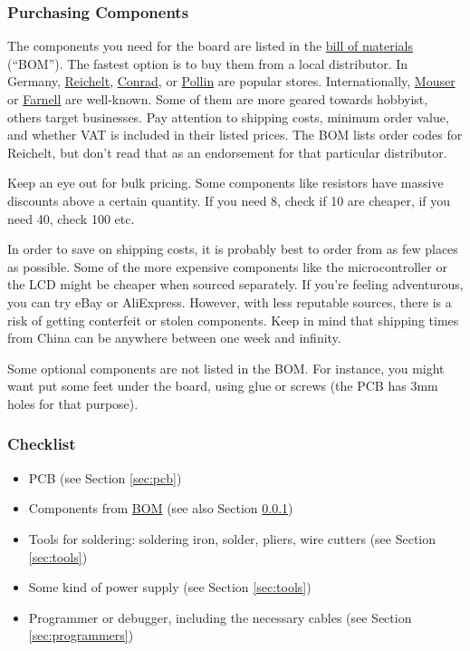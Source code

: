 \documentclass{article}
\begin{document}
\subsubsection{Purchasing Components}\label{sec:comp}
The components you need for the board are listed in the \href{../BOM/BOM.pdf}{bill of materials} (``BOM''). The fastest option is to buy them from a local distributor. In Germany, \href{https://www.reichelt.de/}{Reichelt}, \href{https://www.conrad.de/}{Conrad}, or \href{https://www.pollin.de/}{Pollin} are popular stores. Internationally, \href{https://mouser.com}{Mouser} or \href{https://www.farnell.com/}{Farnell} are well-known. Some of them are more geared towards hobbyist, others target businesses. Pay attention to shipping costs, minimum order value, and whether VAT is included in their listed prices. The BOM lists order codes for Reichelt, but don't read that as an endorsement for that particular distributor. 

Keep an eye out for bulk pricing. Some components like resistors have massive discounts above a certain quantity. If you need 8, check if 10 are cheaper, if you need 40, check 100 etc. 

In order to save on shipping costs, it is probably best to order from as few places as possible. Some of the more expensive components like the microcontroller or the LCD might be cheaper when sourced separately. If you're feeling adventurous, you can try eBay or AliExpress. However, with less reputable sources, there is a risk of getting conterfeit or stolen components. Keep in mind that shipping times from China can be anywhere between one week and infinity. 

Some optional components are not listed in the BOM. For instance, you might want put some feet under the board, using glue or screws (the PCB has 3mm holes for that purpose). 

\subsubsection{Checklist}
\begin{itemize}
\item[\CheckBox{}] PCB (see Section \ref{sec:pcb})
\item[\CheckBox{}] Components from \href{../BOM/BOM.pdf}{BOM} (see also Section \ref{sec:comp})
\item[\CheckBox{}] Tools for soldering: soldering iron, solder, pliers, wire cutters (see Section \ref{sec:tools})
\item[\CheckBox{}] Some kind of power supply (see Section \ref{sec:tools})
\item[\CheckBox{}] Programmer or debugger, including the necessary cables (see Section \ref{sec:programmers})
\end{itemize}
\end{document}
